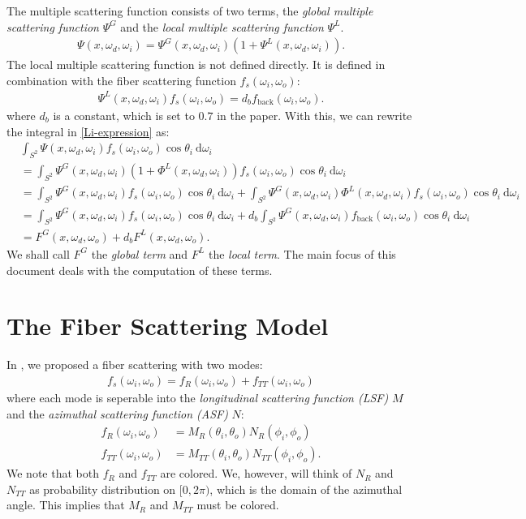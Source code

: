 \documentclass[10pt]{article}
\newcommand{\dee}{\mathrm{d}}
\begin{document}
  The multiple scattering function consists of two terms, the \emph{global multiple scattering function} $\Psi^G$ and the \emph{local multiple scattering function} $\Psi^L$.
  \begin{align*}
  	\Psi(x, \omega_d, \omega_i) = \Psi^G(x,\omega_d,\omega_i) (1+ \Psi^L(x, \omega_d, \omega_i)).
  \end{align*}
  The local multiple scattering function is not defined directly.  It is defined in combination with the fiber scattering function $f_s(\omega_i, \omega_o)$:
  \begin{align*}
  	\Psi^L(x,\omega_d, \omega_i) f_s(\omega_i, \omega_o) = d_b f_{\mathrm{back}}(\omega_i, \omega_o).
  \end{align*}
  where $d_b$ is a constant, which is set to $0.7$ in the paper.  With this, we can rewrite the integral in \eqref{Li-expression} as:
  \begin{align*}
  	& \int_{S^2} \Psi(x, \omega_d, \omega_i) f_s(\omega_i, \omega_o) \cos \theta_i\ \dee \omega_i \\
  	&= \int_{S^2} \Psi^G(x, \omega_d, \omega_i)(1 + \Phi^L(x,\omega_d,\omega_i)) f_s(\omega_i, \omega_o) \cos\theta_i\ \dee \omega_i \\
  	&= \int_{S^2} \Psi^G(x, \omega_d, \omega_i)f_s(\omega_i, \omega_o)\cos\theta_i\ \dee\omega_i + \int_{S^2} \Psi^G(x, \omega_d, \omega_i) \Phi^L(x,\omega_d,\omega_i) f_s(\omega_i, \omega_o) \cos\theta_i\ \dee \omega_i \\
  	&= \int_{S^2} \Psi^G(x, \omega_d, \omega_i)f_s(\omega_i, \omega_o)\cos\theta_i\ \dee\omega_i + d_b \int_{S^2} \Psi^G(x, \omega_d, \omega_i) f_{\mathrm{back}}(\omega_i, \omega_o) \cos\theta_i\ \dee \omega_i \\
  	&= F^G(x,\omega_d, \omega_o) + d_b F^L(x,\omega_d,\omega_o).
  \end{align*}
  We shall call $F^G$ the \emph{global term} and $F^L$ the \emph{local term}.  The main focus of this document deals with the computation of these terms.

  \section{The Fiber Scattering Model}

  In \cite{Khungurn:2015}, we proposed a fiber scattering with two modes:
  \begin{align*}
  	f_s(\omega_i, \omega_o) = f_R(\omega_i, \omega_o) + f_{TT}(\omega_i, \omega_o)
  \end{align*}
  where each mode is seperable into the \emph{longitudinal scattering function (LSF)} $M$ and the \emph{azimuthal scattering function (ASF)} $N$:
  \begin{align*}
  	f_R(\omega_i, \omega_o) &= M_R(\theta_i, \theta_o) N_R(\phi_i, \phi_o) \\
  	f_{TT}(\omega_i, \omega_o) &= M_{TT}(\theta_i, \theta_o) N_{TT}(\phi_i, \phi_o).
  \end{align*}
  We note that both $f_R$ and $f_{TT}$ are colored.  We, however, will think of $N_R$ and $N_{TT}$ as probability distribution on $[0,2\pi)$, which is the domain of the azimuthal angle.  This implies that $M_R$ and $M_{TT}$ must be colored.
\end{document}

